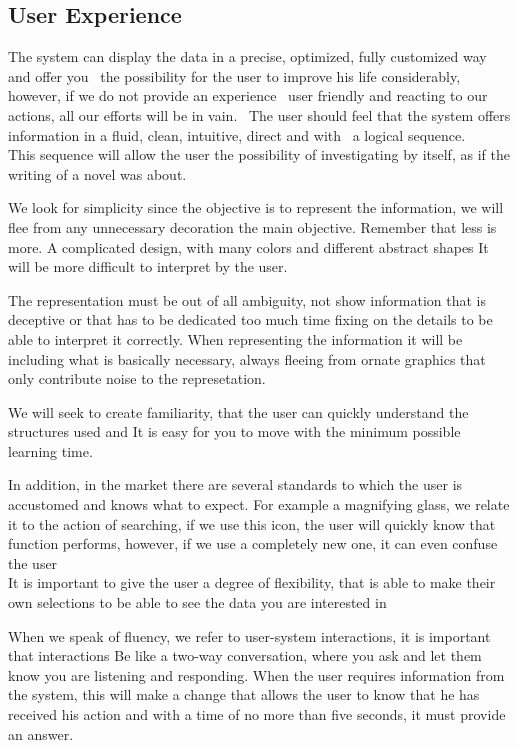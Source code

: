 \subsection{User Experience}
The system can display the data in a precise, optimized, fully customized way and offer you
 the possibility for the user to improve his life considerably, however, if we do not provide an experience
 user friendly and reacting to our actions, all our efforts will be in vain.
 The user should feel that the system offers information in a fluid, clean, intuitive, direct and with
 a logical sequence.
  
This sequence will allow the user the possibility of investigating by itself, as if the writing of a novel was about.

We look for simplicity since the objective is to represent the information, we will flee from any unnecessary decoration
the main objective. Remember that less is more. A complicated design, with many colors and different abstract shapes
It will be more difficult to interpret by the user.

The representation must be out of all ambiguity, not show information that is deceptive or that has to be dedicated
too much time fixing on the details to be able to interpret it correctly. When representing the information it will be
including what is basically necessary, always fleeing from ornate graphics that only contribute noise to the represetation.

We will seek to create familiarity, that the user can quickly understand the structures used and
It is easy for you to move with the minimum possible learning time.

In addition, in the market there are several standards to which the user is accustomed and knows what to expect.
For example a magnifying glass, we relate it to the action of searching, if we use this icon, the user will quickly know that
function performs, however, if we use a completely new one, it can even confuse the user \\

It is important to give the user a degree of flexibility, that is able to make their own selections to be able to see
the data you are interested in

When we speak of fluency, we refer to user-system interactions, it is important that interactions
Be like a two-way conversation, where you ask and let them know you are listening and responding. When the user
requires information from the system, this will make a change that allows the user to know that he has received his action and
with a time of no more than five seconds, it must provide an answer.
    

